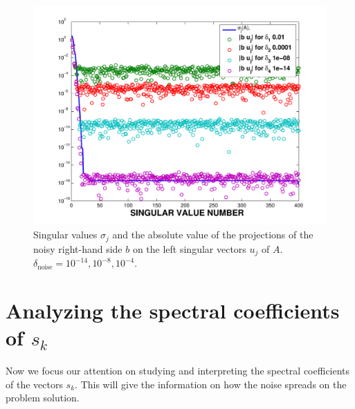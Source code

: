\documentclass[11pt]{amsart}
\begin{document}
\begin{figure}[htb] \label{fig:picard}
  \begin{center}
    \includegraphics[width=.55\linewidth]{../presentation/figures/picard}
  \end{center}
\caption{Singular values $\sigma_{j}$ and the absolute value of the
projections of the noisy right-hand side $b$ on the left singular vectors 
$u_{j}$ of $A$. $\delta_{\text{noise}} = 10^{-14}, 10^{-8}, 10^{-4}$.}
\end{figure}

\section{Analyzing the spectral coefficients of $s_{k}$}
Now we focus our attention on studying and interpreting the spectral 
coefficients of the vectors $s_{k}$. This will give the information on how the
noise spreads on the problem solution.
\end{document}
